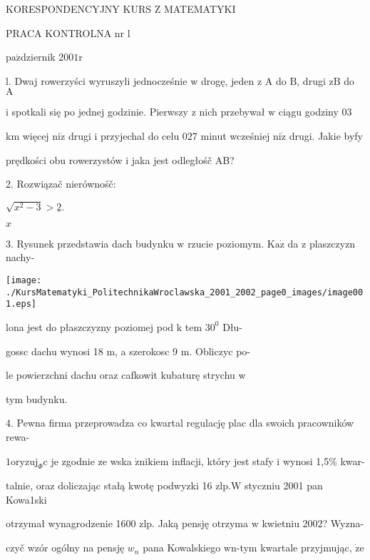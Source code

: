 \documentclass[a4paper,12pt]{article}
\begin{document}
KORESPONDENCYJNY KURS Z MATEMATYKI

PRACA KONTROLNA nr l

$\mathrm{p}\mathrm{a}\acute{\mathrm{z}}$dziernik 2$001\mathrm{r}$

l. Dwaj rowerzyści wyruszyli jednocześnie $\mathrm{w}$ drogę, jeden $\mathrm{z}$ A do $\mathrm{B}$, drugi $\mathrm{z}\mathrm{B}$ do $\mathrm{A}$

$\mathrm{i}$ spotkali się po jednej godzinie. Pierwszy $\mathrm{z}$ nich przebywał $\mathrm{w}$ ciągu godziny $03$

km więcej $\mathrm{n}\mathrm{i}\dot{\mathrm{z}}$ drugi $\mathrm{i}$ przyjechal do celu $027$ minut wcześniej $\mathrm{n}\mathrm{i}\dot{\mathrm{z}}$ drugi. Jakie byfy

prędkości obu rowerzystów $\mathrm{i}$ jaka jest odległośč AB?

2. Rozwiązač nierównośč:

$\sqrt{x^{2}-3}>\underline{2}.$

$x$

3. Rysunek przedstawia dach budynku $\mathrm{w}$ rzucie poziomym. $\mathrm{K}\mathrm{a}\dot{\mathrm{z}}$ da $\mathrm{z}$ plaszczyzn nachy-
\begin{center}
\texttt{[image: ./KursMatematyki\_PolitechnikaWroclawska\_2001\_2002\_page0\_images/image001.eps]}
\end{center}
lona jest do płaszczyzny poziomej pod $\mathrm{k}$ tem $30^{0}$ Dłu-

gossc dachu wynosi 18 $\mathrm{m}$, a szerokosc 9 $\mathrm{m}$. Obliczyc po-

le powierzchni dachu oraz cafkowit kubaturę strychu $\mathrm{w}$

tym budynku.

4. Pewna firma przeprowadza co kwartal regulację plac dla swoich pracowników rewa-

$1\mathrm{o}\mathrm{r}\mathrm{y}\mathrm{z}\mathrm{u}\mathrm{j}_{\Phi}\mathrm{c}$ je zgodnie ze wska $\acute{\mathrm{z}}\mathrm{n}\mathrm{i}\mathrm{k}\mathrm{i}\mathrm{e}\mathrm{m}$ inflacji, który jest stafy $\mathrm{i}$ wynosi 1,5\% kwar-

talnie, oraz doliczając stałą kwotę podwyzki 16 $\mathrm{z}\mathrm{l}\mathrm{p}. \mathrm{W}$ styczniu 2001 pan Kowa1ski

otrzymał wynagrodzenie 1600 $\mathrm{z}\mathrm{l}\mathrm{p}$. Jaką pensję otrzyma $\mathrm{w}$ kwietniu 2002? Wyzna-

czyč wzór ogólny na pensję $w_{n}$ pana Kowalskiego $\mathrm{w}\mathrm{n}$-tym kwartale przyjmując, $\dot{\mathrm{z}}\mathrm{e}$
\end{document}
